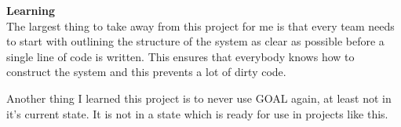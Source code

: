 \noindent
\textbf{Learning}\\
The largest thing to take away from this project for me is that every team needs to start with outlining the structure of the system as clear as possible before a single line of code is written. This ensures that everybody knows how to construct the system and this prevents a lot of dirty code.

Another thing I learned this project is to never use GOAL again, at least not in it's current state. It is not in a state which is ready for use in projects like this.